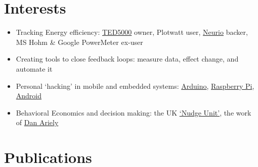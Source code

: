 \documentclass[letterpaper,10pt,english]{sphinxmanual}
\begin{document}
\chapter{Interests}
\label{resume:interests}\begin{itemize}
\item {} 
Tracking Energy efficiency:
\href{http://www.theenergydetective.com/}{TED5000} owner,
Plotwatt user, \href{https://neur.io/}{Neurio}
backer, MS Hohm \& Google
PowerMeter ex-user

\item {} 
Creating tools to close feedback loops: measure data, effect change,
and automate it

\item {} 
Personal `hacking' in mobile and embedded systems:
\href{http://www.arduino.cc/}{Arduino}, \href{http://www.raspberrypi.org/}{Raspberry
Pi},
\href{http://www.android.com/}{Android}

\item {} 
Behavioral Economics and decision making: the UK \href{https://www.gov.uk/government/organisations/behavioural-insights-team}{`Nudge
Unit'},
the work of \href{http://danariely.com/}{Dan Ariely}

\end{itemize}


\chapter{Publications}
\label{resume:publications}
\end{document}
